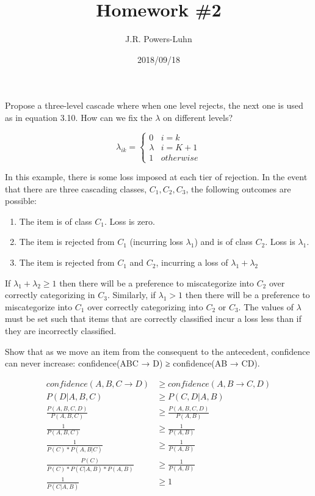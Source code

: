 \documentclass{hw}
\author{J.R. Powers-Luhn}
\date{2018/09/18}
\title{Homework \#2}
\begin{document}

    Propose a three-level cascade where when one level rejects, the next one is used as in equation 3.10. How can we fix the $\lambda$ on different levels? 

    \begin{equation}
        \lambda_{ik} =
        \begin{cases}
        0 & i = k \\
        \lambda & i = K + 1 \\
        1 & otherwise

    \end{cases}
    \end{equation}

\solution
    In this example, there is some loss imposed at each tier of rejection. In the event that there are three cascading classes, $C_1, C_2, C_3$, the following outcomes are possible:
    
    \begin{enumerate}
        \item The item is of class $C_1$. Loss is zero.
        \item The item is rejected from $C_1$ (incurring loss $\lambda_1$) and is of class $C_2$. Loss is $\lambda_1$.
        \item The item is rejected from $C_1$ and $C_2$, incurring a loss of $\lambda_1 + \lambda_2$
    \end{enumerate}

    If $\lambda_1 + \lambda_2 \geq 1$ then there will be a preference to miscategorize into $C_2$ over correctly categorizing in $C_3$. Similarly, if $\lambda_1 > 1$ then there will be a preference to miscategorize into $C_1$ over correctly categorizing into $C_2$ or $C_3$. The values of $\lambda$ must be set such that items that are correctly classified incur a loss less than if they are incorrectly classified.

    Show that as we move an item from the consequent to the antecedent, confidence can never increase: confidence(ABC → D) ≥ confidence(AB → CD).

\solution
    \begin{align*}
        confidence(A,B,C \rightarrow D) &\geq confidence(A,B \rightarrow C,D) \\
        P(D | A, B, C) &\geq P(C, D | A, B) \\
        \frac{P(A, B, C, D)}{P(A, B, C)} &\geq \frac{P(A, B, C, D)}{P(A, B)} \\
        \frac{1}{P(A, B, C)} &\geq \frac{1}{P(A, B)} \\
        \frac{1}{P(C)*P(A,B|C)} &\geq \frac{1}{P(A, B)} \\
        \frac{P(C)}{P(C)*P(C | A, B)*P(A, B)} &\geq \frac{1}{P(A, B)} \\
        \frac{1}{P(C | A, B)} &\geq 1
    \end{align*}
\end{document}
